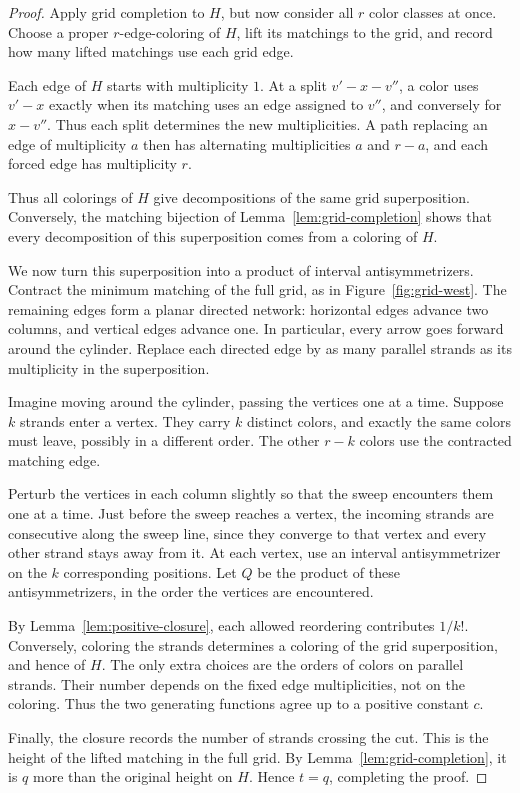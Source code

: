 \documentclass[11pt]{article}
\theoremstyle{definition}
\theoremstyle{remark}
\begin{document}
\begin{proof}


Apply grid completion to $H$, but now consider
all $r$ color classes at once. Choose a proper
$r$-edge-coloring of $H$, lift its matchings to
the grid, and record how many lifted matchings
use each grid edge.


Each edge of $H$ starts with multiplicity $1$. At a split
$v'-x-v''$, a color uses $v'-x$ exactly when its matching
uses an edge assigned to $v''$, and conversely for $x-v''$.
Thus each split determines the new multiplicities. A path
replacing an edge of multiplicity $a$ then has alternating
multiplicities $a$ and $r-a$, and each forced edge has
multiplicity $r$.

Thus all colorings of $H$ give decompositions
of the same grid superposition. Conversely,
the matching bijection of
Lemma~\ref{lem:grid-completion} shows that every
decomposition of this superposition comes from
a coloring of $H$.

We now turn this superposition into a product
of interval antisymmetrizers. Contract the
minimum matching of the full grid, as in
Figure~\ref{fig:grid-west}. The remaining edges
form a planar directed network: horizontal
edges advance two columns, and vertical edges
advance one. In particular, every arrow goes
forward around the cylinder. Replace each
directed edge by as many parallel strands
as its multiplicity in the superposition.

Imagine moving around the cylinder, passing
the vertices one at a time. Suppose $k$ strands
enter a vertex. They carry $k$ distinct colors,
and exactly the same colors must leave, possibly
in a different order. The other $r-k$ colors
use the contracted matching edge.

Perturb the vertices in each column slightly so that
the sweep encounters them one at a time. Just before the
sweep reaches a vertex, the incoming strands are consecutive
along the sweep line, since they converge to that vertex
and every other strand stays away from it. At each
vertex, use an interval antisymmetrizer on
the $k$ corresponding positions. Let $Q$ be
the product of these antisymmetrizers, in the
order the vertices are encountered.


By Lemma~\ref{lem:positive-closure}, each allowed
reordering contributes $1/k!$. Conversely,
coloring the strands determines a coloring of
the grid superposition, and hence of $H$.
The only extra choices are the orders of colors
on parallel strands. Their number depends on
the fixed edge multiplicities, not on the
coloring. Thus the two generating functions
agree up to a positive constant $c$.

Finally, the closure records the number of
strands crossing the cut. This is the height
of the lifted matching in the full grid.
By Lemma~\ref{lem:grid-completion}, it is
$q$ more than the original height on $H$.
Hence $t=q$, completing the proof.
\end{proof}
\end{document}
